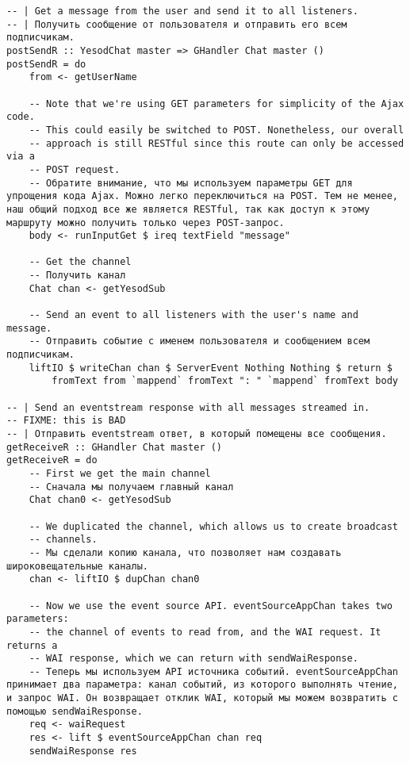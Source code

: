 \begin{lstlisting}
-- | Get a message from the user and send it to all listeners.
-- | Получить сообщение от пользователя и отправить его всем подписчикам.
postSendR :: YesodChat master => GHandler Chat master ()
postSendR = do
    from <- getUserName

    -- Note that we're using GET parameters for simplicity of the Ajax code.
    -- This could easily be switched to POST. Nonetheless, our overall
    -- approach is still RESTful since this route can only be accessed via a
    -- POST request.
    -- Обратите внимание, что мы используем параметры GET для упрощения кода Ajax. Можно легко переключиться на POST. Тем не менее, наш общий подход все же является RESTful, так как доступ к этому маршруту можно получить только через POST-запрос.
    body <- runInputGet $ ireq textField "message"

    -- Get the channel
    -- Получить канал
    Chat chan <- getYesodSub

    -- Send an event to all listeners with the user's name and message.
    -- Отправить событие с именем пользователя и сообщением всем подписчикам.
    liftIO $ writeChan chan $ ServerEvent Nothing Nothing $ return $
        fromText from `mappend` fromText ": " `mappend` fromText body

-- | Send an eventstream response with all messages streamed in.
-- FIXME: this is BAD
-- | Отправить eventstream ответ, в который помещены все сообщения.
getReceiveR :: GHandler Chat master ()
getReceiveR = do
    -- First we get the main channel
    -- Сначала мы получаем главный канал
    Chat chan0 <- getYesodSub

    -- We duplicated the channel, which allows us to create broadcast
    -- channels.
    -- Мы сделали копию канала, что позволяет нам создавать широковещательные каналы.
    chan <- liftIO $ dupChan chan0

    -- Now we use the event source API. eventSourceAppChan takes two parameters:
    -- the channel of events to read from, and the WAI request. It returns a
    -- WAI response, which we can return with sendWaiResponse.
    -- Теперь мы используем API источника событий. eventSourceAppChan принимает два параметра: канал событий, из которого выполнять чтение, и запрос WAI. Он возвращает отклик WAI, который мы можем возвратить с помощью sendWaiResponse.
    req <- waiRequest
    res <- lift $ eventSourceAppChan chan req
    sendWaiResponse res


\end{lstlisting}
